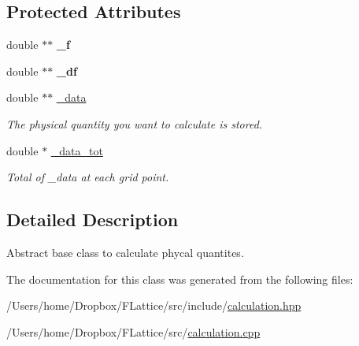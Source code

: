 \subsection*{Protected Attributes}
\begin{DoxyCompactItemize}
\item 
\mbox{\label{class_calculate_base_a5e863d6582d9a59270fa382552a86de0}} 
double $\ast$$\ast$ {\bfseries \+\_\+f}
\item 
\mbox{\label{class_calculate_base_a7b88550952b5b159369a0446e0278b1b}} 
double $\ast$$\ast$ {\bfseries \+\_\+df}
\item 
\mbox{\label{class_calculate_base_ae77ed832e35fb46ae64baec24a9ff359}} 
double $\ast$$\ast$ \mbox{\hyperlink{class_calculate_base_ae77ed832e35fb46ae64baec24a9ff359}{\+\_\+data}}
\begin{DoxyCompactList}\small\item\em The physical quantity you want to calculate is stored. \end{DoxyCompactList}\item 
\mbox{\label{class_calculate_base_a169edba47bb93203963350d3d5e65e00}} 
double $\ast$ \mbox{\hyperlink{class_calculate_base_a169edba47bb93203963350d3d5e65e00}{\+\_\+data\+\_\+tot}}
\begin{DoxyCompactList}\small\item\em Total of \+\_\+data at each grid point. \end{DoxyCompactList}\end{DoxyCompactItemize}


\subsection{Detailed Description}
Abstract base class to calculate phycal quantites. 

The documentation for this class was generated from the following files\+:\begin{DoxyCompactItemize}
\item 
/\+Users/home/\+Dropbox/\+F\+Lattice/src/include/\mbox{\hyperlink{calculation_8hpp}{calculation.\+hpp}}\item 
/\+Users/home/\+Dropbox/\+F\+Lattice/src/\mbox{\hyperlink{calculation_8cpp}{calculation.\+cpp}}\end{DoxyCompactItemize}

